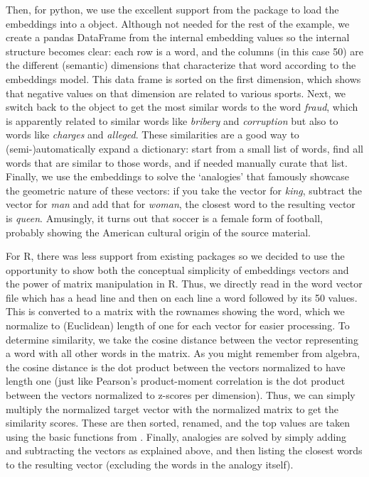Then, for python, we use the excellent support from the  package to load the embeddings into a  object.
Although not needed for the rest of the example, we create a pandas DataFrame from the internal embedding values so the internal structure becomes clear: each row is a word, and the columns (in this case 50) are the different (semantic) dimensions that characterize that word according to the embeddings model.
This data frame is sorted on the first dimension, which shows that negative values on that dimension are related to various sports.
Next, we switch back to the  object to get the most similar words to the word \emph{fraud}, which is apparently related to similar words like \emph{bribery} and \emph{corruption} but also to words like \emph{charges} and \emph{alleged}.
These similarities are a good way to (semi-)automatically expand a dictionary: start from a small list of words,
find all words that are similar to those words, and if needed manually curate that list.
Finally, we use the embeddings to solve the `analogies' that famously showcase the geometric nature of these vectors:
if you take the vector for \emph{king}, subtract the vector for \emph{man} and add that for \emph{woman},
the closest word to the resulting vector is \emph{queen}.
Amusingly, it turns out that soccer is a female form of football, probably showing the American cultural origin of the source material.

For R, there was less support from existing packages so we decided to use the opportunity to show both the conceptual simplicity of embeddings vectors and the power of matrix manipulation in R.
Thus, we directly read in the word vector file which has a head line and then on each line a word followed by its 50 values.
This is converted to a matrix with the rownames showing the word,
which we normalize to (Euclidean) length of one for each vector for easier processing. 
To determine similarity, we take the cosine distance between the vector representing a word with all other words in the matrix.
As you might remember from algebra, the cosine distance is the dot product between the vectors normalized to have length one
(just like Pearson's product-moment correlation is the dot product between the vectors normalized to z-scores per dimension).
Thus, we can simply multiply the normalized target vector with the normalized matrix to get the similarity scores.
These are then sorted, renamed, and the top values are taken using the basic functions from .
Finally, analogies are solved by simply adding and subtracting the vectors as explained above, and then listing the closest words to the resulting vector
(excluding the words in the analogy itself). 

